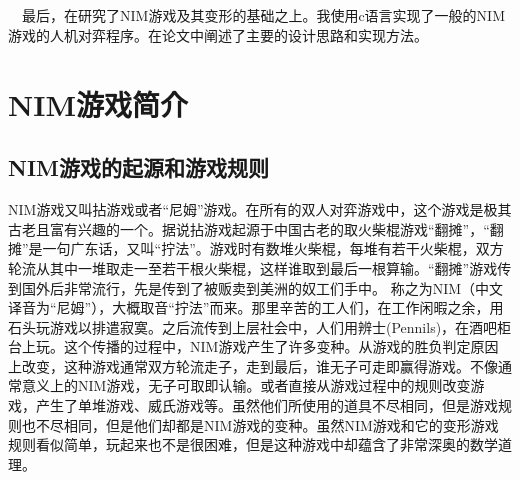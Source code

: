 \documentclass[UTF8,nofonts,cs4size]{ctexrep}
\begin{document}
\paragraph{}
\indent \ \ 
最后，在研究了NIM游戏及其变形的基础之上。我使用c语言实现了一般的NIM游戏的人机对弈程序。在论文中阐述了主要的设计思路和实现方法。


\chapter{NIM游戏简介}
\section{NIM游戏的起源和游戏规则}
NIM游戏又叫拈游戏或者“尼姆”游戏。在所有的双人对弈游戏中，这个游戏是极其古老且富有兴趣的一个。据说拈游戏起源于中国古老的取火柴棍游戏“翻摊”，“翻摊”是一句广东话，又叫“拧法”。游戏时有数堆火柴棍，每堆有若干火柴棍，双方轮流从其中一堆取走一至若干根火柴棍，这样谁取到最后一根算输。“翻摊”游戏传到国外后非常流行，先是传到了被贩卖到美洲的奴工们手中。 称之为NIM（中文译音为“尼姆”），大概取音“拧法”而来。那里辛苦的工人们，在工作闲暇之余，用石头玩游戏以排遣寂寞。之后流传到上层社会中，人们用辨士(Pennils)，在酒吧柜台上玩。这个传播的过程中，NIM游戏产生了许多变种。从游戏的胜负判定原因上改变，这种游戏通常双方轮流走子，走到最后，谁无子可走即赢得游戏。不像通常意义上的NIM游戏，无子可取即认输。或者直接从游戏过程中的规则改变游戏，产生了单堆游戏、威氏游戏等。虽然他们所使用的道具不尽相同，但是游戏规则也不尽相同，但是他们却都是NIM游戏的变种。虽然NIM游戏和它的变形游戏规则看似简单，玩起来也不是很困难，但是这种游戏中却蕴含了非常深奥的数学道理。
\end{document}
